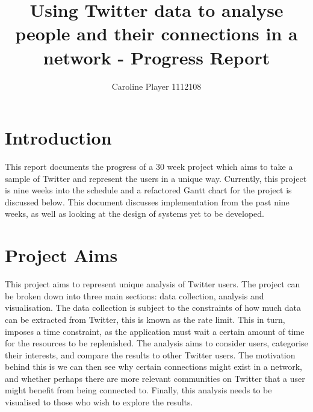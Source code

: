 \documentclass[a4paper]{article}
\title{Using Twitter data to analyse people and their connections in a network - Progress Report}
\author{Caroline Player 1112108}
\date{}
\begin{document}
\maketitle
\pagestyle{plain}

\section{Introduction}
This report documents the progress of a 30 week project which aims to take a sample of Twitter and represent the users in a unique way. Currently, this project is nine weeks into the schedule and a refactored Gantt chart for the project is discussed below. This document discusses implementation from the past nine weeks, as well as looking at the design of systems yet to be developed. 

\section{Project Aims}
This project aims to represent unique analysis of Twitter users. The project can be broken down into three main sections: data collection, analysis and visualisation. The data collection is subject to the constraints of how much data can be extracted from Twitter, this is known as the rate limit. This in turn, imposes a time constraint, as the application must wait a certain amount of time for the resources to be replenished. The analysis aims to consider users, categorise their interests, and compare the results to other Twitter users. The motivation behind this is we can then see why certain connections might exist in a network, and whether perhaps there are more relevant communities on Twitter that a user might benefit from being connected to. Finally, this analysis needs to be visualised to those who wish to explore the results. 
\end{document}
